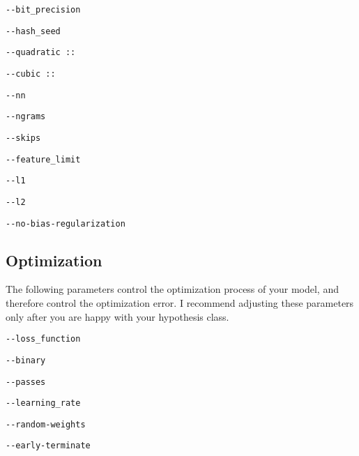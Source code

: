 \documentclass[10pt]{exam}
\theoremstyle{definition}
\begin{document}
    \vspace{1in}
    \lstinline{--bit_precision}

    \vspace{2in}
    \lstinline{--hash_seed}

    \vspace{2in}
    \lstinline{--quadratic ::}

    \vspace{2in}
    \lstinline{--cubic ::}
    
    \vspace{2in}
    \lstinline{--nn}
    
    \vspace{2in}
    \lstinline{--ngrams}
    
    \vspace{2in}
    \lstinline{--skips}
    
    \vspace{2in}
    \lstinline{--feature_limit}
    
    \vspace{2in}
    \lstinline{--l1}
    
    \vspace{2in}
    \lstinline{--l2}
    
    \vspace{2in}
    \lstinline{--no-bias-regularization}
    \vspace{1in}

    \newpage
\subsection{Optimization}
    The following parameters control the optimization process of your model,
    and therefore control the optimization error.
    I recommend adjusting these parameters only after you are happy with your hypothesis class.

    \vspace{0.5in}
    \lstinline{--loss_function}

    \vspace{1in}
    \lstinline{--binary}

    \vspace{1in}
    \lstinline{--passes}

    \vspace{1in}
    \lstinline{--learning_rate}

    \vspace{1in}
    \lstinline{--random-weights}

    \vspace{1in}
    \lstinline{--early-terminate}
\end{document}
